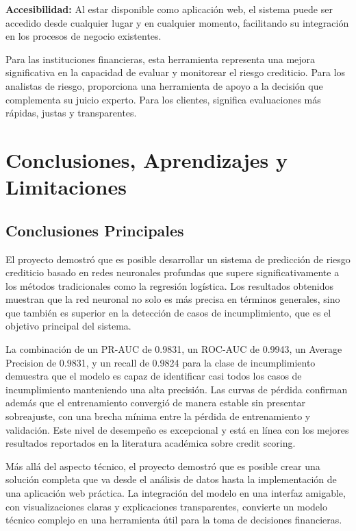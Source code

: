 \documentclass[12pt,a4paper]{article}
\begin{document}
\textbf{Accesibilidad:} Al estar disponible como aplicación web, el sistema puede ser accedido desde cualquier lugar y en cualquier momento, facilitando su integración en los procesos de negocio existentes.

Para las instituciones financieras, esta herramienta representa una mejora significativa en la capacidad de evaluar y monitorear el riesgo crediticio. Para los analistas de riesgo, proporciona una herramienta de apoyo a la decisión que complementa su juicio experto. Para los clientes, significa evaluaciones más rápidas, justas y transparentes.

\section{Conclusiones, Aprendizajes y Limitaciones}

\subsection{Conclusiones Principales}

El proyecto demostró que es posible desarrollar un sistema de predicción de riesgo crediticio basado en redes neuronales profundas que supere significativamente a los métodos tradicionales como la regresión logística. Los resultados obtenidos muestran que la red neuronal no solo es más precisa en términos generales, sino que también es superior en la detección de casos de incumplimiento, que es el objetivo principal del sistema.

La combinación de un PR-AUC de 0.9831, un ROC-AUC de 0.9943, un Average Precision de 0.9831, y un recall de 0.9824 para la clase de incumplimiento demuestra que el modelo es capaz de identificar casi todos los casos de incumplimiento manteniendo una alta precisión. Las curvas de pérdida confirman además que el entrenamiento convergió de manera estable sin presentar sobreajuste, con una brecha mínima entre la pérdida de entrenamiento y validación. Este nivel de desempeño es excepcional y está en línea con los mejores resultados reportados en la literatura académica sobre credit scoring.

Más allá del aspecto técnico, el proyecto demostró que es posible crear una solución completa que va desde el análisis de datos hasta la implementación de una aplicación web práctica. La integración del modelo en una interfaz amigable, con visualizaciones claras y explicaciones transparentes, convierte un modelo técnico complejo en una herramienta útil para la toma de decisiones financieras.
\end{document}
